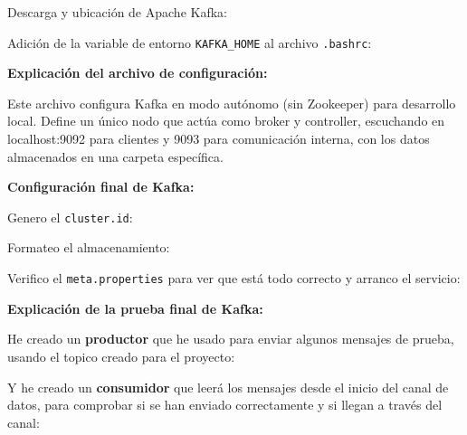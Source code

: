 \documentclass{../../../miPlantilla}
\begin{document}
Descarga y ubicación de Apache Kafka:

\newpage

Adición de la variable de entorno \texttt{KAFKA\_HOME} al archivo \texttt{.bashrc}:

\textbf{Explicación del archivo de configuración:}

Este archivo configura Kafka en modo autónomo (sin Zookeeper) para desarrollo local. Define un único nodo que actúa como broker y controller,
escuchando en localhost:9092 para clientes y 9093 para comunicación interna, con los datos almacenados en una carpeta específica.

\textbf{Configuración final de Kafka:}

Genero el \texttt{cluster.id}:

Formateo el almacenamiento:

\newpage

Verifico el \texttt{meta.properties} para ver que está todo correcto y arranco el servicio:

\textbf{Explicación de la prueba final de Kafka:}

He creado un \textbf{productor} que he usado para enviar algunos mensajes de prueba, usando el topico creado para el proyecto:

Y he creado un \textbf{consumidor} que leerá los mensajes desde el inicio del canal de datos, para comprobar si se han enviado correctamente y si 
llegan a través del canal:
\end{document}
